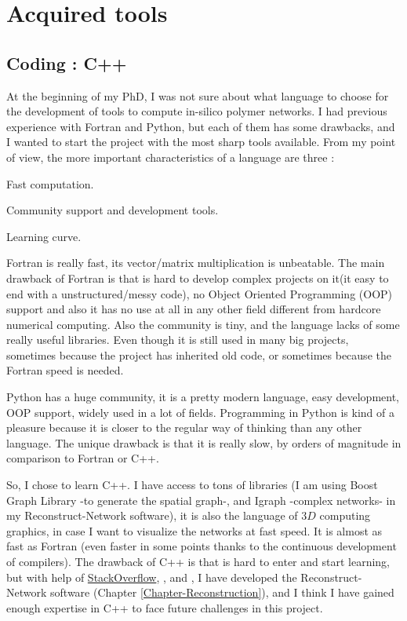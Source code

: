 
\chapter{Acquired tools} %

\label{Appendix-tools} %


\section{Coding : C++}
At the beginning of my PhD, I was not sure about what language to choose for the
development of tools to compute in-silico polymer networks. I had previous
experience with Fortran and Python, but each of them has some drawbacks, and I wanted to start
the project with the most sharp tools available. From my point of
view, the more important characteristics of a language are three :
\begin{enumerate*}[label=\bfseries\alph*)]
\item Fast computation. 
\item Community support and development tools.
\item Learning curve.
\end{enumerate*}
 
Fortran is really fast, its vector/matrix multiplication is unbeatable. The main
drawback of Fortran is that is hard to develop complex projects on it(it easy
to end with a unstructured/messy code), no Object Oriented Programming (OOP)
support and also it has no use at all in any other field different from hardcore numerical computing. Also the community is
tiny, and the language lacks of some really useful libraries.
Even though it is still used in many big projects, sometimes because the project has inherited old code,
 or sometimes because the Fortran speed is needed. 

Python has a huge community, it is a pretty modern language, easy development,
OOP support, widely used in a lot of fields. Programming in Python is kind of a
pleasure because it is closer to the regular way of thinking than any other
language. The unique drawback is that it is really slow, by orders of magnitude
in comparison to Fortran or C++. 

So, I chose to learn C++. I have access to tons of libraries (I am using
Boost Graph Library -to generate the spatial graph-, and Igraph -complex
networks- in my Reconstruct-Network software), it is also the language of $3D$  computing
graphics, in case I want to visualize the networks at fast speed.  It is almost
as fast as Fortran (even faster in some points thanks to the continuous
development of compilers). The drawback of C++ is that is hard to enter and
start learning, but with help of
\href{http://www.stackoverflow.com}{StackOverflow},
\citet{stroustrup_c++_2013}, and \citet{lippman_c++_2013}, I have developed the
Reconstruct-Network software (Chapter \ref{Chapter-Reconstruction}),
and I think I have gained enough expertise in C++ to face future challenges in this project.


